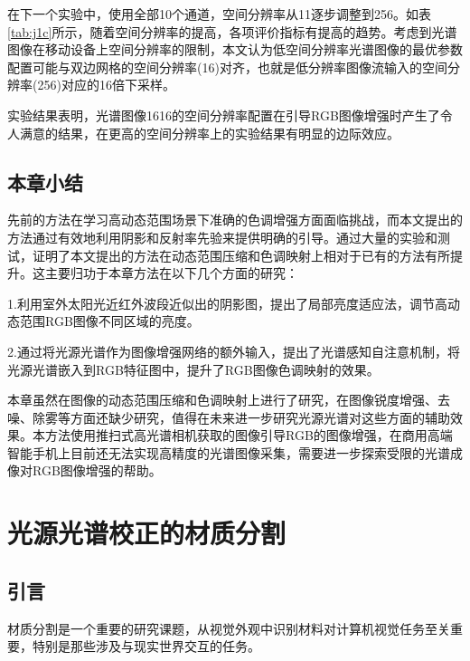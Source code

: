 \documentclass[
    type = master, %
    degree = academic,        %
    decl-page,  %
  ]{njuthesis}
\begin{document}
在下一个实验中，使用全部10个通道，空间分辨率从1\times1逐步调整到256。如表\ref{tab:j1c}所示，随着空间分辨率的提高，各项评价指标有提高的趋势。考虑到光谱图像在移动设备上空间分辨率的限制，本文认为低空间分辨率光谱图像的最优参数配置可能与双边网格的空间分辨率(16)对齐，也就是低分辨率图像流输入的空间分辨率(256)对应的16倍下采样。

实验结果表明，光谱图像16\times16的空间分辨率配置在引导RGB图像增强时产生了令人满意的结果，在更高的空间分辨率上的实验结果有明显的边际效应。

\section{本章小结}
先前的方法在学习高动态范围场景下准确的色调增强方面面临挑战，而本文提出的方法通过有效地利用阴影和反射率先验来提供明确的引导。通过大量的实验和测试，证明了本文提出的方法在动态范围压缩和色调映射上相对于已有的方法有所提升。这主要归功于本章方法在以下几个方面的研究：

1.利用室外太阳光近红外波段近似出的阴影图，提出了局部亮度适应法，调节高动态范围RGB图像不同区域的亮度。

2.通过将光源光谱作为图像增强网络的额外输入，提出了光谱感知自注意机制，将光源光谱嵌入到RGB特征图中，提升了RGB图像色调映射的效果。

本章虽然在图像的动态范围压缩和色调映射上进行了研究，在图像锐度增强、去噪、除雾等方面还缺少研究，值得在未来进一步研究光源光谱对这些方面的辅助效果。本方法使用推扫式高光谱相机获取的图像引导RGB的图像增强，在商用高端智能手机上目前还无法实现高精度的光谱图像采集，需要进一步探索受限的光谱成像对RGB图像增强的帮助。

\chapter{光源光谱校正的材质分割}
\section{引言}
材质分割是一个重要的研究课题，从视觉外观中识别材料对计算机视觉任务至关重要，特别是那些涉及与现实世界交互的任务。
\end{document}
